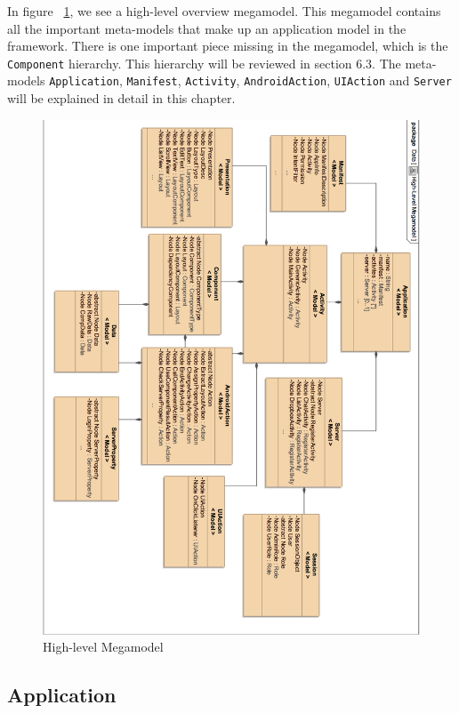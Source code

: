 In figure ~\ref{fig:highlevel_mm}, we see a high-level overview megamodel. This megamodel contains all the important meta-models that make up an application model in the framework. There is one important piece missing in the megamodel, which is the \texttt{Component} hierarchy. This hierarchy will be reviewed in section 6.3. The meta-models \texttt{Application}, \texttt{Manifest}, \texttt{Activity}, \texttt{AndroidAction}, \texttt{UIAction} and \texttt{Server} will be explained in detail in this chapter. 
\begin{figure}[h!]
\centering
\includegraphics[width=1.02\textwidth]{images/chap6_high_level.png}
\caption{High-level Megamodel}
\label{fig:highlevel_mm}
\end{figure}

\subsection{Application}

